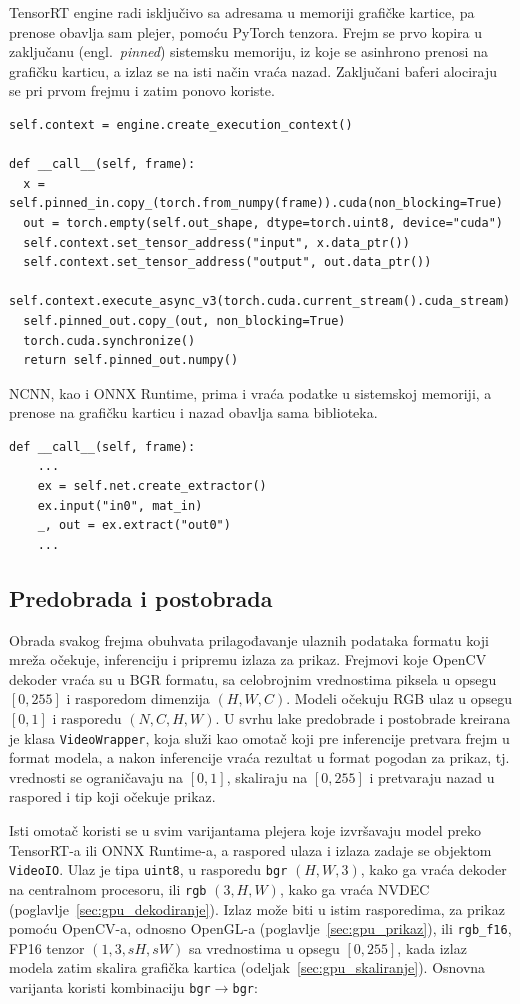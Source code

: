 \documentclass[12pt,a4paper]{article}
\begin{document}
TensorRT engine radi isključivo sa adresama u memoriji grafičke kartice, pa prenose obavlja sam plejer, pomoću PyTorch tenzora. Frejm se prvo kopira u zaključanu (engl.\ \textit{pinned}) sistemsku memoriju, iz koje se asinhrono prenosi na grafičku karticu, a izlaz se na isti način vraća nazad. Zaključani baferi alociraju se pri prvom frejmu i zatim ponovo koriste.
\begin{verbatim}
self.context = engine.create_execution_context()

def __call__(self, frame):
  x = self.pinned_in.copy_(torch.from_numpy(frame)).cuda(non_blocking=True)
  out = torch.empty(self.out_shape, dtype=torch.uint8, device="cuda")
  self.context.set_tensor_address("input", x.data_ptr())
  self.context.set_tensor_address("output", out.data_ptr())
  self.context.execute_async_v3(torch.cuda.current_stream().cuda_stream)
  self.pinned_out.copy_(out, non_blocking=True)
  torch.cuda.synchronize()
  return self.pinned_out.numpy()
\end{verbatim}

NCNN, kao i ONNX Runtime, prima i vraća podatke u sistemskoj memoriji, a prenose na grafičku karticu i nazad obavlja sama biblioteka.
\begin{verbatim}
def __call__(self, frame):
    ...
    ex = self.net.create_extractor()
    ex.input("in0", mat_in)
    _, out = ex.extract("out0")
    ...
\end{verbatim}

\subsection{Predobrada i postobrada}
\label{sec:omotac}

Obrada svakog frejma obuhvata prilagođavanje ulaznih podataka formatu koji mreža očekuje, inferenciju i pripremu izlaza za prikaz. Frejmovi koje OpenCV dekoder vraća su u BGR formatu, sa celobrojnim vrednostima piksela u opsegu $[0, 255]$ i rasporedom dimenzija $(H, W, C)$. Modeli očekuju RGB ulaz u opsegu $[0, 1]$ i rasporedu $(N, C, H, W)$. U svrhu lake predobrade i postobrade kreirana je klasa \texttt{VideoWrapper}, koja služi kao omotač koji pre inferencije pretvara frejm u format modela, a nakon inferencije vraća rezultat u format pogodan za prikaz, tj. vrednosti se ograničavaju na $[0,1]$, skaliraju na $[0,255]$ i pretvaraju nazad u raspored i tip koji očekuje prikaz.

Isti omotač koristi se u svim varijantama plejera koje izvršavaju model preko TensorRT-a ili ONNX Runtime-a, a raspored ulaza i izlaza zadaje se objektom \texttt{VideoIO}. Ulaz je tipa \texttt{uint8}, u rasporedu \texttt{bgr} $(H,W,3)$, kako ga vraća dekoder na centralnom procesoru, ili \texttt{rgb} $(3,H,W)$, kako ga vraća NVDEC (poglavlje~\ref{sec:gpu_dekodiranje}). Izlaz može biti u istim rasporedima, za prikaz pomoću OpenCV-a, odnosno OpenGL-a (poglavlje~\ref{sec:gpu_prikaz}), ili \texttt{rgb\_f16}, FP16 tenzor $(1,3,sH,sW)$ sa vrednostima u opsegu $[0,255]$, kada izlaz modela zatim skalira grafička kartica (odeljak~\ref{sec:gpu_skaliranje}). Osnovna varijanta koristi kombinaciju \texttt{bgr}$\to$\texttt{bgr}:
\end{document}
